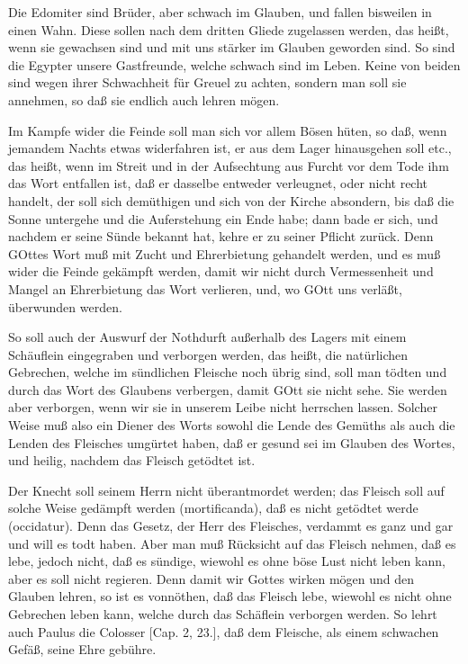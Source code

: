 Die Edomiter sind Brüder, aber schwach im Glauben, und fallen bisweilen in einen Wahn. Diese sollen nach dem dritten Gliede zugelassen werden, das heißt, wenn sie gewachsen sind und mit uns stärker im Glauben geworden sind. So sind die Egypter unsere Gastfreunde, welche schwach sind im Leben. Keine von beiden sind wegen ihrer Schwachheit für Greuel zu achten, sondern man soll sie annehmen, so daß sie endlich auch lehren mögen.

Im Kampfe wider die Feinde soll man sich vor allem Bösen hüten, so daß, wenn jemandem Nachts etwas widerfahren ist, er aus dem Lager hinausgehen soll etc., das heißt, wenn im Streit und in der Aufsechtung aus Furcht vor dem Tode ihm das Wort entfallen ist, daß er dasselbe entweder verleugnet, oder nicht recht handelt, der soll sich demüthigen und sich von der Kirche absondern, bis daß die Sonne untergehe und die Auferstehung ein Ende habe; dann bade er sich, und nachdem er seine Sünde bekannt hat, kehre er zu seiner Pflicht zurück. Denn GOttes Wort muß mit Zucht und Ehrerbietung gehandelt werden, und es muß wider die Feinde gekämpft werden, damit wir nicht durch Vermessenheit und Mangel an Ehrerbietung das Wort verlieren, und, wo GOtt uns verläßt, überwunden werden.

So soll auch der Auswurf der Nothdurft außerhalb des Lagers mit einem Schäuflein eingegraben und verborgen werden, das heißt, die natürlichen Gebrechen, welche im sündlichen Fleische noch übrig sind, soll man tödten und durch das Wort des Glaubens verbergen, damit GOtt sie nicht sehe. Sie werden aber verborgen, wenn wir sie in unserem Leibe nicht herrschen lassen. Solcher Weise muß also ein Diener des Worts sowohl die Lende des Gemüths als auch die Lenden des Fleisches umgürtet haben, daß er gesund sei im Glauben des Wortes, und heilig, nachdem das Fleisch getödtet ist.

Der Knecht soll seinem Herrn nicht überantmordet
werden; das Fleisch soll auf solche Weise gedämpft werden (mortificanda), daß es nicht getödtet werde (occidatur). Denn das Gesetz, der Herr des Fleisches, verdammt es ganz und gar und will es todt haben. Aber man muß Rücksicht auf das Fleisch nehmen, daß es lebe, jedoch nicht, daß es sündige, wiewohl es ohne böse Lust nicht leben kann, aber es soll nicht regieren. Denn damit wir Gottes wirken mögen und den Glauben lehren, so ist es vonnöthen, daß das Fleisch lebe, wiewohl es nicht ohne Gebrechen leben kann, welche durch das Schäflein verborgen werden. So lehrt auch Paulus die Colosser [Cap. 2, 23.], daß dem Fleische, als einem schwachen Gefäß, seine Ehre gebühre.

